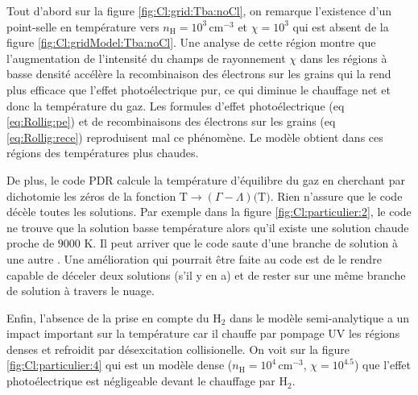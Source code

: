 Tout d'abord sur la figure \ref{fig:Cl:grid:Tba:noCl}, on remarque l'existence d'un point-selle en température vers $n_\mathrm{H}=10^3 \, \mathrm{cm}^{-3}$ et $\chi=10^3$ qui est absent de la figure \ref{fig:Cl:gridModel:Tba:noCl}. Une analyse de cette région montre que l'augmentation de l'intensité du champs de rayonnement $\chi$ dans les régions à basse densité accélère la recombinaison des électrons sur les grains qui la rend plus efficace que l'effet photoélectrique pur, ce qui diminue le chauffage net et donc la température du gaz. Les formules d'effet photoélectrique (eq \ref{eq:Rollig:pe}) et de recombinaisons des électrons sur les grains (eq \ref{eq:Rollig:rece}) reproduisent mal ce phénomène. Le modèle obtient dans ces régions des températures plus chaudes. \newline 

De plus, le code PDR calcule la température d'équilibre du gaz en cherchant par dichotomie les zéros de la fonction $\mathrm{T} \rightarrow (\Gamma - \Lambda)(\mathrm{T)}$. Rien n'assure que le code décèle toutes les solutions. Par exemple dans la figure \ref{fig:Cl:particulier:2}, le code ne trouve que la solution basse température alors qu'il existe une solution chaude proche de $9000$ K. Il peut arriver que le code saute d'une branche de solution à une autre 
. Une amélioration qui pourrait être faite au code est de le rendre capable de déceler deux solutions (s'il y en a) et de rester sur une même branche de solution à travers le nuage. \newline 

Enfin, l'absence de la prise en compte du $\mathrm{H}_2$ dans le modèle semi-analytique a un impact important sur la température car il chauffe par pompage UV les régions denses et refroidit par désexcitation collisionelle. On voit sur la figure \ref{fig:Cl:particulier:4} qui est un modèle dense ($n_\mathrm{H}=10^4 \, \mathrm{cm}^{-3}$, $\chi=10^{4.5}$) que l'effet photoélectrique est négligeable devant le chauffage par $\mathrm{H}_2$. 


